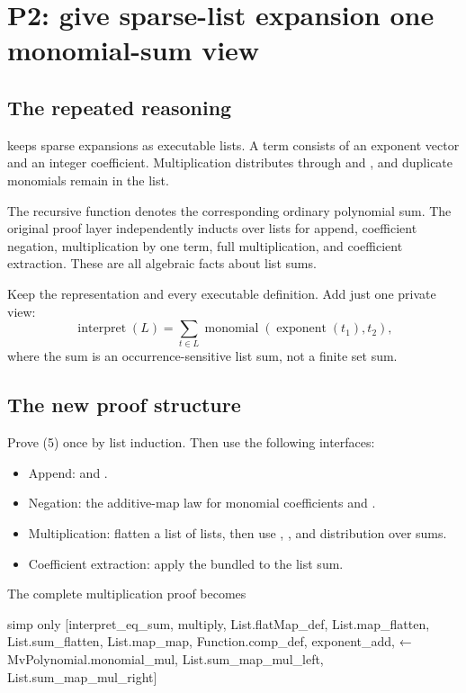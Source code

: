 \section{P2: give sparse-list expansion one monomial-sum view}

\subsection{The repeated reasoning}

 keeps sparse expansions
as executable lists. A term consists of an exponent vector and an integer
coefficient. Multiplication distributes through  and
, and duplicate monomials remain in the list.

The recursive  function denotes the corresponding ordinary
polynomial sum. The original proof layer independently inducts over lists
for append, coefficient negation, multiplication by one term, full
multiplication, and coefficient extraction. These are all algebraic facts
about list sums.

Keep the representation and every executable definition. Add just one
private view:
\[
 \operatorname{interpret}(L)=
 \sum_{t\in L}\operatorname{monomial}(\operatorname{exponent}(t_1),t_2),
 \tag{5}
\]
where the sum is an occurrence-sensitive list sum, not a finite set sum.

\subsection{The new proof structure}

Prove (5) once by list induction. Then use the following interfaces:

\begin{itemize}
\item Append:  and .
\item Negation: the additive-map law for monomial coefficients and
.
\item Multiplication: flatten a list of lists, then use
, , and distribution over sums.
\item Coefficient extraction: apply the bundled
 to the list sum.
\end{itemize}

The complete multiplication proof becomes
\begin{Lean}
  simp only [interpret_eq_sum, multiply, List.flatMap_def,
    List.map_flatten, List.sum_flatten, List.map_map,
    Function.comp_def, exponent_add,
    ← MvPolynomial.monomial_mul,
    List.sum_map_mul_left, List.sum_map_mul_right]
\end{Lean}

